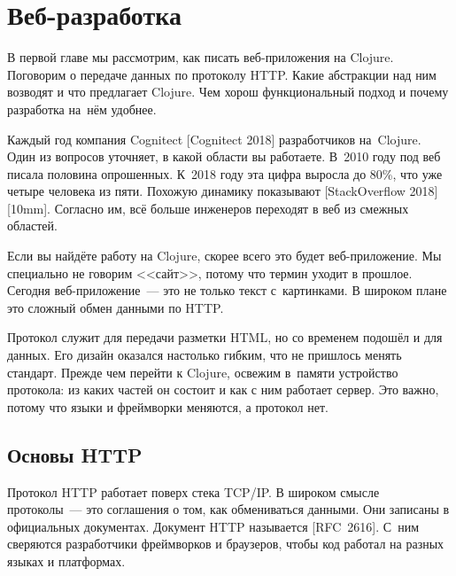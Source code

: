 \chapter{Веб-разработка}

\begin{teaser}
В первой главе мы рассмотрим, как писать веб-приложения на Clojure. Поговорим о
передаче данных по протоколу HTTP. Какие абстракции над ним возводят и что
предлагает Clojure. Чем хорош функциональный подход и почему разработка на~нём
удобнее.
\end{teaser}


Каждый год компания Cognitect [Cognitect 2018]
разработчиков на~Clojure. Один из вопросов уточняет, в какой области вы
работаете. В~2010 году под веб писала половина опрошенных. К~2018 году эта цифра
выросла до 80\%, что уже четыре человека из пяти. Похожую динамику показывают [Stack\-Overflow 2018][10mm].
Согласно им, всё больше инженеров переходят в веб из смежных областей.

Если вы найдёте работу на Clojure, скорее всего это будет веб-приложение. Мы
специально не говорим <<сайт>>, потому что термин уходит в прошлое. Сегодня
веб-приложение~--- это не только текст с~картинками. В широком плане это сложный
обмен данными по HTTP.

Протокол служит для передачи разметки HTML, но со временем подошёл и для
данных. Его дизайн оказался настолько гибким, что не пришлось менять
стандарт. Прежде чем перейти к Clojure, освежим в~памяти устройство протокола:
из каких частей он состоит и как с ним работает сервер. Это важно, потому что
языки и фреймворки меняются, а протокол нет.

\section{Основы HTTP}


Протокол HTTP работает поверх стека TCP/IP. В широком смысле протоколы~--- это
соглашения о том, как обмениваться данными. Они записаны в официальных
документах. Документ HTTP называется [RFC~2616].
С~ним сверяются разработчики фреймворков и браузеров, чтобы код работал
на разных языках и платформах.

